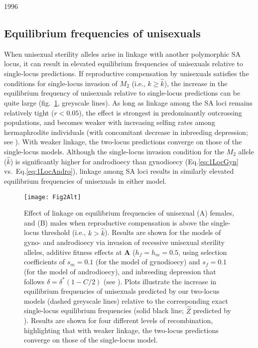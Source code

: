 1996\documentclass[9pt,twocolumn,twoside,lineno]{gsajnl}
\begin{document}
\subsection{Equilibrium frequencies of unisexuals}

When unisexual sterility alleles arise in linkage with another polymorphic SA locus, it can result in elevated equilibrium frequencies of unisexuals relative to single-locus predictions. If reproductive compensation by unisexuals satisfies the conditions for single-locus invasion of $M_2$ (i.e., $k \geq \hat{k}$), the increase in the equilibrium frequency of unisexuals relative to single-locus predictions can be quite large (fig.~\ref{fig:eqFreq2v1Loc}, greyscale lines). As long as linkage among the SA loci remains relatively tight ($r < 0.05$), the effect is strongest in predominantly outcrossing populations, and becomes weaker with increasing selfing rates among hermaphrodite individuals (with concomitant decrease in inbreeding depression; see ). With weaker linkage, the two-locus predictions converge on those of the single-locus models. Although the single-locus invasion condition for the $M_2$ allele ($\hat{k}$) is significantly higher for androdioecy than gynodioecy (Eq.\ref{eq:1LocGyn} vs.~Eq.\ref{eq:1LocAndro}), linkage among SA loci results in similarly elevated equilibrium frequencies of unisexuals in either model.

\begin{figure}[htbp]
\centering
\texttt{[image: Fig2Alt]}
\caption{Effect of linkage on equilibrium frequencies of unisexual (A) females, and (B) males when reproductive compensation is above the single-locus threshold (i.e., $k > \hat{k}$). Results are shown for the models of gyno- and androdioecy via invasion of recessive unisexual sterility alleles, additive fitness effects at $\mathbf{A}$ ($h_f = h_m = 0.5$, using selection coefficients of $s_m = 0.1$ (for the model of gynodioecy) and $s_f = 0.1$ (for the model of androdioecy), and inbreeding depression that follows $\delta = \delta^\ast(1 - C/2)$ (see ). Plots illustrate the increase in equilibrium frequencies of unisexuals predicted by our two-locus models (dashed greyscale lines) relative to the corresponding exact single-locus equilibrium frequencies (solid black line; $\hat{Z}$ predicted by \citealt{Charlesworth1978a}). Results are shown for four different levels of recombination, highlighting that with weaker linkage, the two-locus predictions converge on those of the single-locus model.}
\label{fig:eqFreq2v1Loc}
\end{figure}
\end{document}
